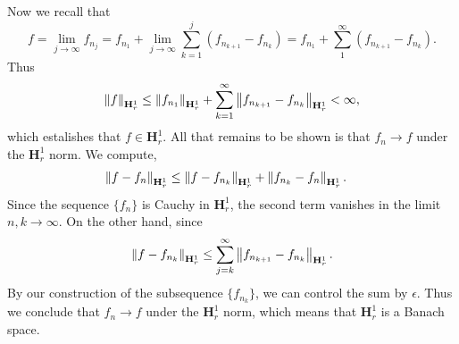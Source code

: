 \documentclass{article}
\begin{document}
Now we recall that 
\begin{equation*}
	f = \lim_{j \to\infty}f_{n_{j}} = f_{n_{1}} + \lim_{j \to \infty}\sum_{k = 1}^{j}(f_{n_{k + 1}} - f_{n_{k}}) = f_{n_{1}} + \sum_{1}^{\infty}(f_{n_{k + 1}} - f_{n_{k}}). 
\end{equation*} 
Thus 
\begin{equation*}
	\left\Vert f \right\Vert_{\mathbf{H}^{1}_{r}} \leq \left\Vert f_{n_{1}} \right\Vert_{\mathbf{H}^{1}_{r}} + \sum_{k = 1}^{\infty}\left\Vert f_{n_{k + 1}} - f_{n_{k}} \right\Vert_{\mathbf{H}^{1}_{r}} < \infty, 
\end{equation*}
which estalishes that $f \in \mathbf{H}^{1}_{r}$. All that remains to be shown is that $f_{n} \to f$ under the $\mathbf{H}_{r}^{1}$ norm. We compute, 
\begin{align*}
	\begin{split}
		\left\Vert f - f_{n} \right\Vert_{\mathbf{H}^{1}_{r}} &\leq \left\Vert f - f_{n_{k}} \right\Vert_{\mathbf{H}^{1}_{r}} + \left\Vert f_{n_{k}} - f_{n} \right\Vert_{\mathbf{H}^{1}_{r}}. 
	\end{split} 
\end{align*} 
Since the sequence $\{f_{n}\}$ is Cauchy in $\mathbf{H}^{1}_{r}$, the second term vanishes in the limit $n, k \to \infty$. On the other hand, since 
\begin{equation*}
	\left\Vert f - f_{n_{k}} \right\Vert_{\mathbf{H}^{1}_{r}} \leq \sum_{j = k}^{\infty}\left\Vert f_{n_{k + 1}} - f_{n_{k}} \right\Vert_{\mathbf{H}^{1}_{r}}. 
\end{equation*} 
By our construction of the subsequence $\{f_{n_{k}}\}$, we can control the sum by $\epsilon$. Thus we conclude that $f_{n} \to f$ under the $\mathbf{H}^{1}_{r}$ norm, which means that $\mathbf{H}^{1}_{r}$ is a Banach space. 
\end{document}
